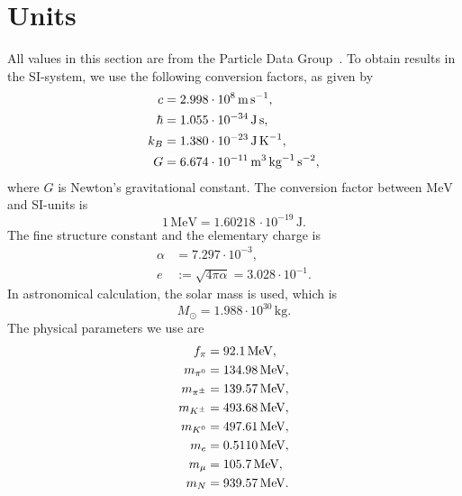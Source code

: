 \section{Units}
\label{section: units}

All values in this section are from the Particle Data Group~\cite{particledatagroupReviewParticlePhysics2020}.
To obtain results in the SI-system, we use the following conversion factors, as given by
%
\begin{align}
    \label{speed of ligh}
    c       &= 2.998 \cdot 10^8     \, \text{m} \, \text{s}^{-1}, \\
    \label{hbar}
    \hbar   &= 1.055 \cdot 10^{-34} \, \text{J} \, \text{s}, \\
    \label{Boltzmanns constat}
    k_B     &= 1.380 \cdot 10^{-23} \, \text{J} \, \text K^{-1}, \\
    \label{Newtons gravitational constant}
    G       &= 6.674 \cdot 10^{-11} \, \text m^3 \, \text{kg}^{-1} \, \text s^{-2},
\end{align}
%
where $G$ is Newton's gravitational constant.
The conversion factor between $\text{MeV}$ and SI-units is
%
\begin{equation}
    \label{electronvolt}
    1 \, \text{MeV} = 1.60218\, \cdot 10^{-19} \, \text{J}. 
\end{equation}
%
The fine structure constant and the elementary charge is
%
\begin{align}
    \label{Fine structure constant}
    \alpha &= 7.297 \cdot 10^{-3}, \\
    \label{Elementary charge}
    e &:= \sqrt{4 \pi \alpha} =  3.028\cdot 10^{-1}.
\end{align}
%
In astronomical calculation, the solar mass is used, which is
%
\begin{equation}
    \label{solar mass}
    M_\odot = 1.988 \cdot 10^{30} \, \text{kg}.
\end{equation}
%
The physical parameters we use are
%
\begingroup
\allowdisplaybreaks %
\begin{align}
    \label{pion decay constant}
    f_\pi & =  92.1 \, \text{MeV}, \\
    \label{pion mass}
    m_{\pi^0} & = 134.98 \, \text{MeV}, \\
    \label{charged pion mass}
    m_{{\pi^\pm}} &= 139.57 \, \text{MeV}, \\
    m_{{K^\pm}} & = 493.68\,\text{MeV}, \\
    m_{{K^0}} & = 497.61\,\text{MeV}, \\
    m_e &= 0.5110 \, \text{MeV}, \\
    m_\mu &= 105.7 \, \text{MeV}, \\
    \label{mass of neutron}
    m_N &= 939.57 \, \text{MeV}.
\end{align}
\endgroup

